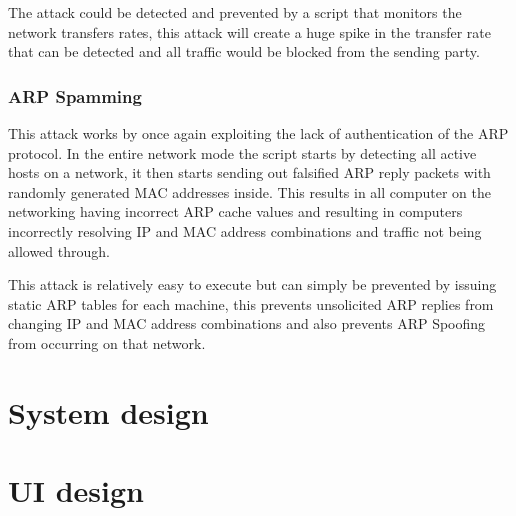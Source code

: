 The attack could be detected and prevented by a script that monitors the network transfers rates, this attack will create a huge spike in the transfer rate that can be detected and all traffic would be blocked from the sending party.

\subsubsection{ARP Spamming}
This attack works by once again exploiting the lack of authentication of the ARP protocol. In the entire network mode the script starts by detecting all active hosts on a network, it then starts sending out falsified ARP reply packets with randomly generated MAC addresses inside. This results in all computer on the networking having incorrect ARP cache values and resulting in computers incorrectly resolving IP and MAC address combinations and traffic not being allowed through.

This attack is relatively easy to execute but can simply be prevented by issuing static ARP tables for each machine, this prevents unsolicited ARP replies from changing IP and MAC address combinations and also prevents ARP Spoofing from occurring on that network.

\section{System design}



\section{UI design}



